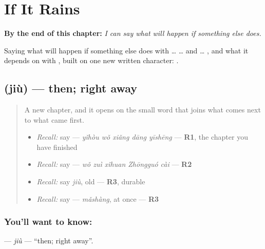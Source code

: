 
\chapter{If It Rains}
\label{ch:zh-if-it-rains}

\begin{chapteropening}
\textbf{By the end of this chapter:} \emph{I can say what will happen if something else does.}

Saying what will happen if something else does with  …  … and … , and what it depends on with , built on one new written character: .
\end{chapteropening}

\section[\texorpdfstring{\zh{就} (jiù)}{就 (jiù)}]{ (jiù) — then; right away}

\label{lesson:ZH-C288-jiu}



\begin{quote}
A new chapter, and it opens on the small word that joins what comes next to what came first.

\begin{itemize}
\raggedright
  \item \emph{Recall:} say  — \emph{yǐhòu wǒ xiǎng dāng yīshēng} — \textbf{R1}, the chapter you have finished
  \item \emph{Recall:} say  — \emph{wǒ zuì xǐhuan Zhōngguó cài} — \textbf{R2}
  \item \emph{Recall:} say \emph{jiù}, old — \textbf{R3}, durable
  \item \emph{Recall:} say  — \emph{mǎshàng}, at once — \textbf{R3}
\end{itemize}
\end{quote}

\subsection*{You'll want to know: }
\textbf{} — \emph{jiù} — \textquotedblleft{}then; right away\textquotedblright{}.

